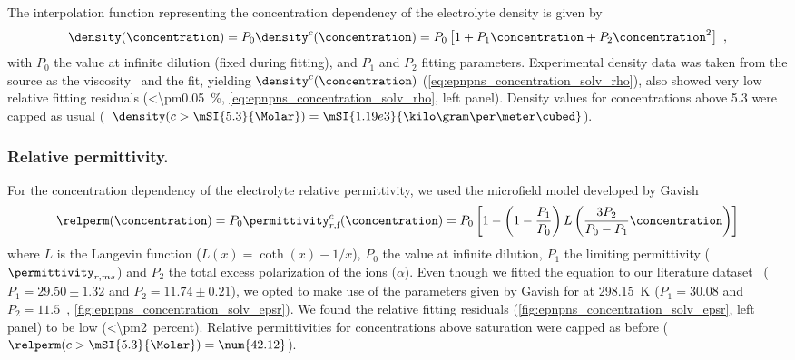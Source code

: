 The interpolation function representing the concentration dependency of the electrolyte density is given by
%
\begin{align}\label{eq:epnpns_concentration_solv_rho}
  \density (\concentration) = P_0 \density^c (\concentration) =
  P_0 \left[ 1
            + P_1 \concentration
            + P_2 \concentration^{2}
      \right]
  \text{ ,}
\end{align}
%
with $P_0$ the value at infinite dilution (fixed during fitting), and $P_1$ and $P_2$ fitting parameters.
Experimental density data was taken from the source as the viscosity~\cite{Hai-Lang-1996} and the fit,
yielding $\density^c (\concentration)$ (\cref{eq:epnpns_concentration_solv_rho}), also showed very low
relative fitting residuals (\SI{<\pm0.05}{\percent}, \cref{eq:epnpns_concentration_solv_rho}, left panel).
Density values for concentrations above \SI{5.3}{\Molar} were capped as usual (\ie~$\density (c >
\mSI{5.3}{\Molar}) = \mSI{1.19e3}{\kilo\gram\per\meter\cubed}$).


\subsubsection{Relative permittivity.}
%

For the concentration dependency of the electrolyte relative permittivity, we used the microfield model
developed by Gavish \etal{}~\cite{Gavish-2016}
%
\begin{align}\label{eq:epnpns_concentration_solv_epsr}
  \relperm (\concentration) = P_0 \permittivity_{r,\text{f}}^c (\concentration) =
  P_0 \left[ 1
              - \left( 1 - \dfrac{P_1}{P_0}\right)
              L \left( \dfrac{3 P_2}{P_0 - P_1} \concentration \right)
      \right]
\end{align}
%
where $L$ is the Langevin function ($L(x) = \coth{(x)} - 1/x$), $P_0$ the value at infinite dilution, $P_1$
the limiting permittivity ($\permittivity_{r,ms}$) and $P_2$ the total excess polarization of the ions
($\alpha$). Even though we fitted the equation to our literature dataset~\cite{Buchner-1999} ($P_1 =
29.50\pm1.32$ and $P_2 = 11.74\pm0.21$), we opted to make use of the parameters given by Gavish for 
at \SI{298.15}{\kelvin} ($P_1 = 30.08$ and $P_2 = 11.5$~\cite{Gavish-2016},
\cref{fig:epnpns_concentration_solv_epsr}). We found the relative fitting residuals
(\cref{fig:epnpns_concentration_solv_epsr}, left panel) to be low (\SI{<\pm2}{percent}). Relative
permittivities for concentrations above saturation were capped as before (\ie~$\relperm (c >
\mSI{5.3}{\Molar}) = \num{42.12}$).


